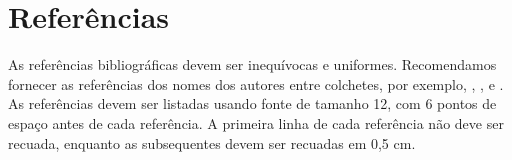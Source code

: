 \documentclass[12pt]{article}
\begin{document}
\section{Referências}

As referências bibliográficas devem ser inequívocas e uniformes. Recomendamos fornecer
as referências dos nomes dos autores entre colchetes, por exemplo, \cite{knuth:84},
\cite{boulic:91}, e \cite{smith:99}. As referências devem ser listadas usando fonte de tamanho 12, com 6 pontos de espaço
antes de cada referência. A primeira linha de cada referência não deve ser
recuada, enquanto as subsequentes devem ser recuadas em 0,5 cm.



\end{document}
